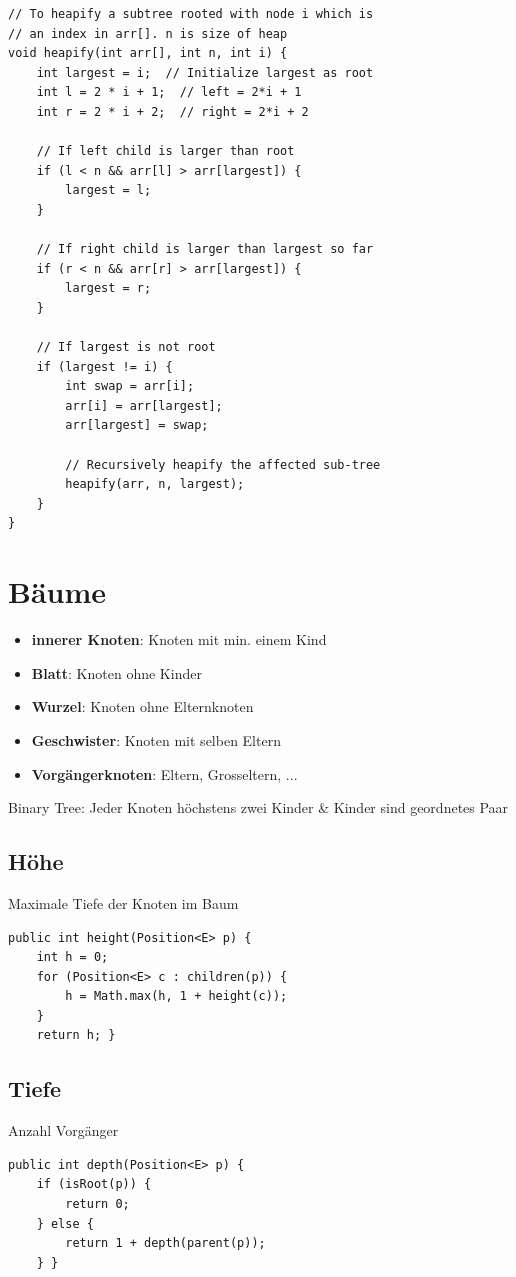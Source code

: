 \begin{multicols*}{4}
\begin{lstlisting}
// To heapify a subtree rooted with node i which is 
// an index in arr[]. n is size of heap 
void heapify(int arr[], int n, int i) { 
	int largest = i;  // Initialize largest as root 
	int l = 2 * i + 1;  // left = 2*i + 1 
	int r = 2 * i + 2;  // right = 2*i + 2 
	
	// If left child is larger than root 
	if (l < n && arr[l] > arr[largest]) {
		largest = l; 
	}
	
	// If right child is larger than largest so far 
	if (r < n && arr[r] > arr[largest]) {
		largest = r; 
	}
	
	// If largest is not root 
	if (largest != i) { 
		int swap = arr[i]; 
		arr[i] = arr[largest]; 
		arr[largest] = swap; 
		
		// Recursively heapify the affected sub-tree 
		heapify(arr, n, largest); 
	} 
} 
			\end{lstlisting}

		
		
\section{Bäume}
	\begin{itemize}
		\item \textbf{innerer Knoten}: Knoten mit min. einem Kind
		\item \textbf{Blatt}: Knoten ohne Kinder
		\item \textbf{Wurzel}: Knoten ohne Elternknoten
		\item \textbf{Geschwister}: Knoten mit selben Eltern
		\item \textbf{Vorgängerknoten}: Eltern, Grosseltern, ...
	\end{itemize}

	Binary Tree: Jeder Knoten höchstens zwei Kinder \& Kinder sind geordnetes Paar

	\subsection{Höhe}
	Maximale Tiefe der Knoten im Baum
		\begin{lstlisting}
public int height(Position<E> p) {
	int h = 0;
	for (Position<E> c : children(p)) {
		h = Math.max(h, 1 + height(c));
	}
	return h; }
		\end{lstlisting}
	
	\subsection{Tiefe}
	Anzahl Vorgänger
		\begin{lstlisting}
public int depth(Position<E> p) {
	if (isRoot(p)) {
		return 0;
	} else {
		return 1 + depth(parent(p));
	} }
		\end{lstlisting}

\end{multicols*}
